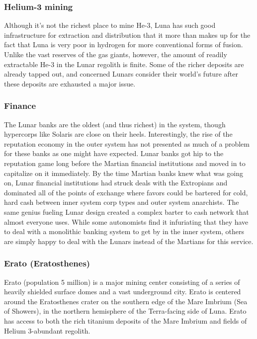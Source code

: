 \subsubsection{Helium-3 mining} \label{sec:helium-3-mining} 

Although it's not the richest place to mine He-3, Luna has such good infrastructure for extraction and distribution that it more than makes up for the fact that Luna is very poor in hydrogen for more conventional forms of fusion. Unlike the vast reserves of the gas giants, however, the amount of readily extractable He-3 in the Lunar regolith is finite. Some of the richer deposits are already tapped out, and concerned Lunars consider their world's future after these deposits are exhausted a major issue. 

\subsubsection{Finance} \label{sec:finance} 

The Lunar banks are the oldest (and thus richest) in the system, though hypercorps like Solaris are close on their heels. Interestingly, the rise of the reputation economy in the outer system has not presented as much of a problem for these banks as one might have expected. Lunar banks got hip to the reputation game long before the Martian financial institutions and moved in to capitalize on it immediately. By the time Martian banks knew what was going on, Lunar financial institutions had struck deals with the Extropians and dominated all of the points of exchange where favors could be bartered for cold, hard cash between inner system corp types and outer system anarchists. The same genius fueling Lunar design created a complex barter to cash network that almost everyone uses. While some autonomists find it infuriating that they have to deal with a monolithic banking system to get by in the inner system, others are simply happy to deal with the Lunars instead of the Martians for this service. 

\subsubsection{Erato (Eratosthenes)} \label{sec:erato-eratosthenes} 

Erato (population 5 million) is a major mining center consisting of a series of heavily shielded surface domes and a vast underground city. Erato is centered around the Eratosthenes crater on the southern edge of the Mare Imbrium (Sea of Showers), in the northern hemisphere of the Terra-facing side of Luna. Erato has access to both the rich titanium deposits of the Mare Imbrium and fields of Helium 3-abundant regolith. 

